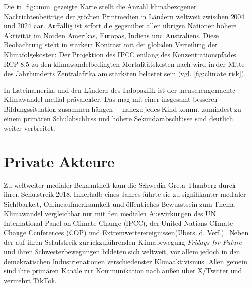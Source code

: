 Die in \cref{fig:omm} gezeigte Karte stellt die Anzahl klimabezogener Nachrichtenbeiträge der größten Printmedien in Ländern weltweit zwischen 2004 und 2024 dar.
Auffällig ist sofort die gegenüber allen übrigen Nationen höhere Aktivität im Norden Amerikas, Europas, Indiens und Australiens.
Diese Beobachtung steht in starkem Kontrast mit der globalen Verteilung der Klimafolgekosten:
Der Projektion des IPCC entlang des Konzentrationspfades RCP 8.5 zu den klimawandelbedingten Mortalitätskosten nach wird in der Mitte des Jahrhunderts Zentralafrika am stärksten belastet sein (vgl. \cref{fig:climate risk}).

{%
\vspace{\baselineskip}
\centering

\label{fig:omm}
\vspace{\baselineskip}
}

In Lateinamerika und den Ländern des Indopazifik ist der menschengemachte Klimawandel medial prävalenter.
Das mag mit einer insgesamt besseren Bildungssituation zusammen hängen~-- nahezu jedes Kind kommt zumindest zu einem primären Schulabschluss und höhere Sekundärabschlüsse sind deutlich weiter verbreitet\,\cite{Article..GlobalEducationMonitoringReport.}.

\section{Private Akteure}

Zu weltweiter medialer Bekanntheit kam die Schwedin Greta Thunberg durch ihren Schulstreik 2018.
Innerhalb eines Jahres führte sie \glqq zu signifikanter medialer Sichtbarkeit, Onlineaufmerksamkeit und öffentliches Bewusstsein zum Thema Klimawandel vergleichbar nur mit den medialen Auswirkungen des UN International Panel on Climate Change (IPCC), der United Nations Climate Change Conferences (COP) und Extremwetterereignissen\grqq (Übers. d. Verf.)\,\cite{Article.Mede.TheGretaEffectOnSocialMediaASystematicReviewOfResearchOnThunbergsImpactOnDigitalClimateChangeCommunication.2024}.
Neben der auf ihren Schulstreik zurückzuführenden Klimabewegung \textit{Fridays for Future} und ihren Schwesterbewegungen bildeten sich weltweit, vor allem jedoch in den demokratischen Industrienationen verschiedenster Klimaaktivismus.
Allen gemein sind ihre primären Kanäle zur Kommunikation nach außen über X/Twitter und vermehrt TikTok.


